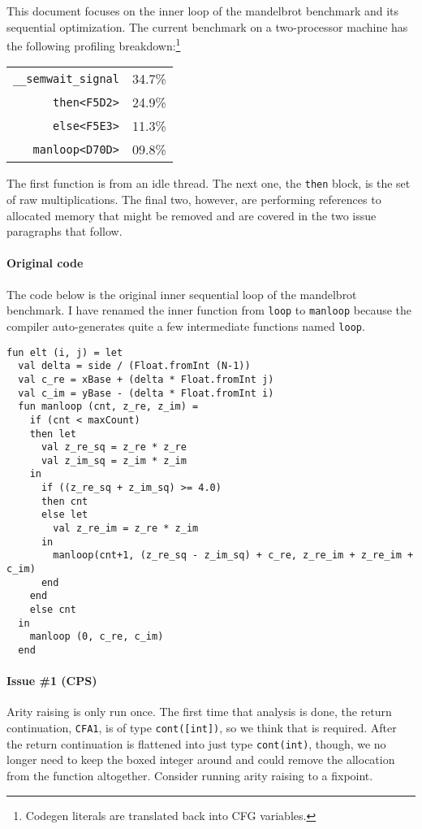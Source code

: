 \documentclass[11pt]{article}
\begin{document}
This document focuses on the inner loop of the mandelbrot benchmark and its sequential optimization. The current benchmark on a two-processor machine has the following profiling breakdown:\footnote{Codegen literals are translated back into CFG variables.}
\begin{center}
\begin{tabular}{r|c}
\texttt{\_\_semwait\_signal} & 34.7\% \\
\texttt{then<F5D2>} & 24.9\% \\
\texttt{else<F5E3>} & 11.3\%\\
\texttt{manloop<D70D>} & 09.8\% \\
\end{tabular}
\end{center}

The first function is from an idle thread. The next one, the \texttt{then} block, is the set of raw multiplications. The final two, however, are performing references to allocated memory that might be removed and are covered in the two issue paragraphs that follow.

\paragraph {Original code}
The code below is the original inner sequential loop of the mandelbrot benchmark. I have renamed the inner function from \texttt{loop} to \texttt{manloop} because the compiler auto-generates quite a few intermediate functions named \texttt{loop}.

\begin{lstlisting}
fun elt (i, j) = let
  val delta = side / (Float.fromInt (N-1))
  val c_re = xBase + (delta * Float.fromInt j)
  val c_im = yBase - (delta * Float.fromInt i)
  fun manloop (cnt, z_re, z_im) = 
    if (cnt < maxCount)
    then let
      val z_re_sq = z_re * z_re
      val z_im_sq = z_im * z_im
    in
      if ((z_re_sq + z_im_sq) >= 4.0)
      then cnt
      else let
        val z_re_im = z_re * z_im
      in
        manloop(cnt+1, (z_re_sq - z_im_sq) + c_re, z_re_im + z_re_im + c_im)
      end
    end
    else cnt
  in
    manloop (0, c_re, c_im)
  end
\end{lstlisting}

\paragraph{Issue \#1 (CPS)}
Arity raising is only run once. The first time that analysis is done, the return continuation, \texttt{CFA1}, is of type \texttt{cont([int])}, so we think that is required. After the return continuation is flattened into just type \texttt{cont(int)}, though, we no longer need to keep the boxed integer around and could remove the allocation from the function altogether. Consider running arity raising to a fixpoint.
\end{document}
